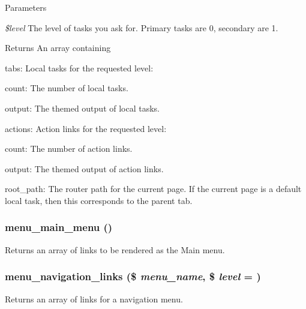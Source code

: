 \begin{DoxyParams}{Parameters}
\item[{\em \$level}]The level of tasks you ask for. Primary tasks are 0, secondary are 1.\end{DoxyParams}
\begin{DoxyReturn}{Returns}
An array containing
\begin{DoxyItemize}
\item tabs: Local tasks for the requested level:
\begin{DoxyItemize}
\item count: The number of local tasks.
\item output: The themed output of local tasks.
\end{DoxyItemize}
\item actions: Action links for the requested level:
\begin{DoxyItemize}
\item count: The number of action links.
\item output: The themed output of action links.
\end{DoxyItemize}
\item root\_\-path: The router path for the current page. If the current page is a default local task, then this corresponds to the parent tab. 
\end{DoxyItemize}
\end{DoxyReturn}
\hypertarget{group__menu_ga47957cf684d4a76b6e8a5eac09d2db94}{
\subsubsection[{menu\_\-main\_\-menu}]{\setlength{\rightskip}{0pt plus 5cm}menu\_\-main\_\-menu ()}}
\label{group__menu_ga47957cf684d4a76b6e8a5eac09d2db94}
Returns an array of links to be rendered as the Main menu. \hypertarget{group__menu_gab4cdacc813ae9e06271aa4aa2d9495a7}{
\subsubsection[{menu\_\-navigation\_\-links}]{\setlength{\rightskip}{0pt plus 5cm}menu\_\-navigation\_\-links (\$ {\em menu\_\-name}, \/  \$ {\em level} = {})}}
\label{group__menu_gab4cdacc813ae9e06271aa4aa2d9495a7}
Returns an array of links for a navigation menu.


